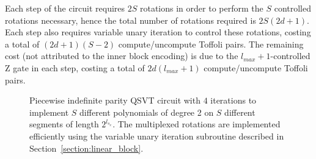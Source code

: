 \documentclass[aps,prx,twocolumn,floatfix,10pt,amssymb,amsfont,amsmath,superscriptaddress,float,nofootinbib,longbibliography,nobalancelastpage]{revtex4-2}
\theoremstyle{empty}
\begin{document}
Each step of the circuit requires $2S$ rotations in order to perform the $S$ controlled rotations necessary, hence the total number of rotations required is $2S(2d+1)$. Each step also requires variable unary iteration to control these rotations, costing a total of $(2d+1)(S-2)$ compute/uncompute Toffoli pairs. The remaining cost (not attributed to the inner block encoding) is due to the $l_{max}+1$-controlled Z gate in each step, costing a total of $2d(l_{max}+1)$ compute/uncompute Toffoli pairs.
\begin{figure}[htbp]
\caption{Piecewise indefinite parity QSVT circuit with $4$ iterations to implement $S$ different polynomials of degree 2 on $S$ different segments of length $2^{l_{s_x}}$. The multiplexed rotations are implemented efficiently using the variable unary iteration subroutine described in Section~\ref{section:linear_block}.}
\label{fig:circuit}
\end{figure}
\end{document}
